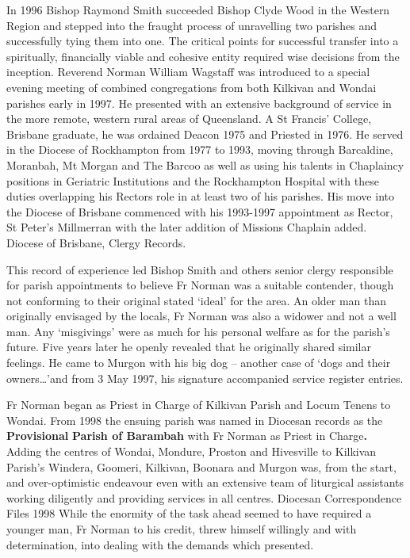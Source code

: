 In 1996 Bishop Raymond Smith succeeded Bishop Clyde Wood in the Western Region and stepped into the fraught process of unravelling two parishes and successfully tying them into one. The critical points for successful transfer into a spiritually, financially viable and cohesive entity required wise decisions from the inception. Reverend Norman William Wagstaff was introduced to a special evening meeting of combined congregations from both Kilkivan and Wondai parishes early in 1997. He presented with an extensive background of service in the more remote, western rural areas of Queensland. A St Francis' College, Brisbane graduate, he was ordained Deacon 1975 and Priested in 1976. He served in the Diocese of Rockhampton from 1977 to 1993, moving through Barcaldine, Moranbah, Mt Morgan and The Barcoo as well as using his talents in Chaplaincy positions in Geriatric Institutions and the Rockhampton Hospital with these duties overlapping his Rectors role in at least two of his parishes. His move into the Diocese of Brisbane commenced with his 1993-1997 appointment as Rector, St Peter's Millmerran with the later addition of Missions Chaplain added. Diocese of Brisbane, Clergy Records.

This record of experience led Bishop Smith and others senior clergy responsible for parish appointments to believe Fr Norman was a suitable contender, though not conforming to their original stated `ideal' for the area. An older man than originally envisaged by the locals, Fr Norman was also a widower and not a well man. Any `misgivings' were as much for his personal welfare as for the parish's future. Five years later he openly revealed that he originally shared similar feelings. He came to Murgon with his big dog -- another case of `dogs and their owners\ldots'and from 3 May 1997, his signature accompanied service register entries.

Fr Norman began as Priest in Charge of Kilkivan Parish and Locum Tenens to Wondai. From 1998 the ensuing parish was named in Diocesan records as the \textbf{Provisional} \textbf{Parish of Barambah} with Fr Norman as Priest in Charge\textbf{.} Adding the centres of Wondai, Mondure, Proston and Hivesville to Kilkivan Parish's Windera, Goomeri, Kilkivan, Boonara and Murgon was, from the start, and over-optimistic endeavour even with an extensive team of liturgical assistants working diligently and providing services in all centres. Diocesan Correspondence Files 1998 While the enormity of the task ahead seemed to have required a younger man, Fr Norman to his credit, threw himself willingly and with determination, into dealing with the demands which presented.

